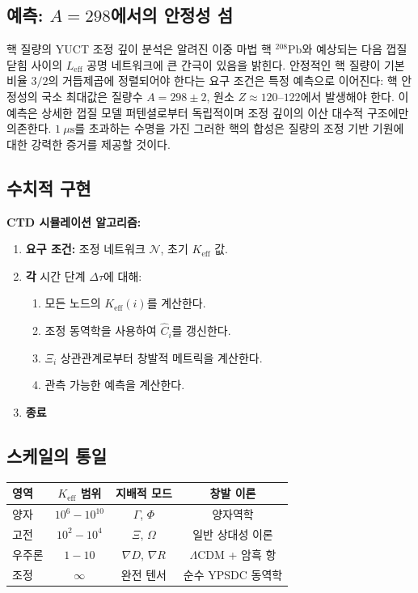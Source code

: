 \documentclass[11pt,a4paper]{article}
\begin{document}
	\subsection{예측: $A=298$에서의 안정성 섬}
	
	핵 질량의 YUCT 조정 깊이 분석은 알려진 이중 마법 핵 $^{208}\mathrm{Pb}$와 예상되는 다음 껍질 닫힘 사이의 $L_{\mathrm{eff}}$ 공명 네트워크에 큰 간극이 있음을 밝힌다. 안정적인 핵 질량이 기본 비율 $3/2$의 거듭제곱에 정렬되어야 한다는 요구 조건은 특정 예측으로 이어진다: 핵 안정성의 국소 최대값은 질량수 $A = 298 \pm 2$, 원소 $Z \approx 120$--$122$에서 발생해야 한다. 이 예측은 상세한 껍질 모델 퍼텐셜로부터 독립적이며 조정 깊이의 이산 대수적 구조에만 의존한다. $1\ \mu\text{s}$를 초과하는 수명을 가진 그러한 핵의 합성은 질량의 조정 기반 기원에 대한 강력한 증거를 제공할 것이다.
	
	\subsection{수치적 구현}
	
	\textbf{CTD 시뮬레이션 알고리즘:}
	\begin{enumerate}
		\item \textbf{요구 조건:} 조정 네트워크 $\mathcal{N}$, 초기 $K_{\mathrm{eff}}$ 값.
		\item \textbf{각} 시간 단계 $\Delta\tau$에 대해:
		\begin{enumerate}
			\item 모든 노드의 $K_{\mathrm{eff}}(i)$를 계산한다.
			\item 조정 동역학을 사용하여 $\hat{C}_i$를 갱신한다.
			\item $\Xi_i$ 상관관계로부터 창발적 메트릭을 계산한다.
			\item 관측 가능한 예측을 계산한다.
		\end{enumerate}
		\item \textbf{종료}
	\end{enumerate}
	
	\subsection{스케일의 통일}
	
	\begin{table}[htbp]
		\centering
		\begin{tabular}{lccc}
			\toprule
			\textbf{영역} & \textbf{$K_{\mathrm{eff}}$ 범위} & \textbf{지배적 모드} & \textbf{창발 이론} \\
			\midrule
			양자 & $10^6-10^{10}$ & $\Gamma$, $\Phi$ & 양자역학 \\
			고전 & $10^2-10^4$ & $\Xi$, $\Omega$ & 일반 상대성 이론 \\
			우주론 & $1-10$ & $\nabla D$, $\nabla R$ & $\Lambda$CDM + 암흑 항 \\
			조정 & $\infty$ & 완전 텐서 & 순수 YPSDC 동역학 \\
			\bottomrule
		\end{tabular}
	\end{table}
	
\end{document}
